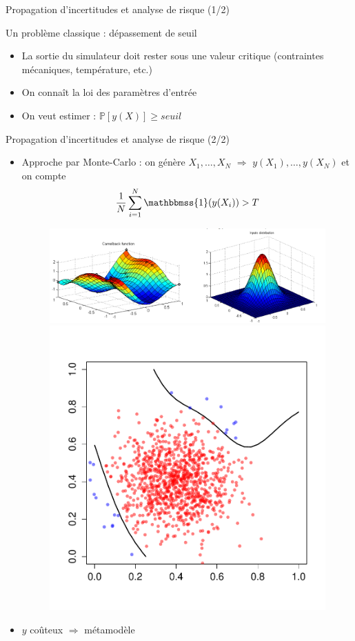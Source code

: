 \begin{frame}{Propagation d'incertitudes et analyse de risque (1/2)}
\begin{block}{Un problème classique : dépassement de seuil}
\begin{itemize}
 \item La sortie du simulateur doit rester sous une valeur critique (contraintes mécaniques, température, etc.)
 \item On connaît la loi des paramètres d'entrée
 \item On veut estimer : $\mathbb{P}\left[ y(X)\right] \geq seuil$
\end{itemize}
\end{block}

\vspace{10mm}

\end{frame}
\begin{frame}{Propagation d'incertitudes et analyse de risque (2/2)}
\begin{itemize}
 \item Approche par Monte-Carlo : on génère $X_1, \ldots, X_N$ $\Rightarrow$ $y(X_1), \ldots, y(X_N)$ et on compte 
 $$\frac{1}{N}\sum_{i=1}^N \mathbbmss{1}(y(X_i)) > T$$
\begin{figure}
\centering
\includegraphics[trim=0 0 200mm 0, width=.55\textwidth, clip]{figT/branin.png} 
\includegraphics[width=.4\textwidth]{figT/MCex.pdf} 
\end{figure}
 \item $y$ coûteux $\Rightarrow$ métamodèle
\end{itemize}
\end{frame}
